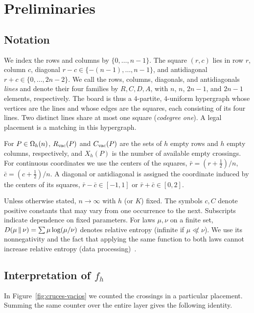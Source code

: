 \section{Preliminaries}\label{sec:preliminares}

\subsection{Notation}

We index the rows and columns by $\{0,\dots,n-1\}$. The square $(r,c)$ lies in row $r$, column $c$, diagonal
$r-c\in\{-(n-1),\dots,n-1\}$, and antidiagonal $r+c\in\{0,\dots,2n-2\}$. We call the rows, columns,
diagonals, and antidiagonals
\emph{lines} and denote their four families by $R,C,D,A$, with $n$, $n$, $2n-1$, and $2n-1$ elements,
respectively. The board is thus
a $4$-partite, $4$-uniform hypergraph whose vertices are the lines and whose edges are the squares, each
consisting of its four lines.
Two distinct lines share at most one square (\emph{codegree one}). A legal placement is a matching in this
hypergraph.

For $P\in\Omega_h(n)$, $R_{\mathrm{vac}}(P)$ and $C_{\mathrm{vac}}(P)$ are the sets of $h$ empty rows and $h$ empty columns,
respectively, and $X_h(P)$ is the
number of available empty crossings. For continuous coordinates we use the centers of the squares,
$\bar r=(r+\frac12)/n$, $\bar c=(c+\frac12)/n$.
A diagonal or antidiagonal is assigned the coordinate induced by the centers of its squares,
$\bar r-\bar c\in[-1,1]$ or $\bar r+\bar
c\in[0,2]$.

Unless otherwise stated, $n\to\infty$ with $h$ (or $K$) fixed. The symbols $c,C$ denote positive constants
that may vary from one
occurrence to the next. Subscripts indicate dependence on fixed parameters. For laws $\mu,\nu$ on a finite
set,
$D(\mu\,\Vert\,\nu)=\sum\mu\log(\mu/\nu)$ denotes relative entropy (infinite if $\mu\not\ll\nu$). We use its
nonnegativity and the fact that
applying the same function to both laws cannot increase relative entropy (data
processing)~\cite{CoverThomas}.

\subsection{Interpretation of \texorpdfstring{$f_h$}{fh}}

In Figure~\ref{fig:cruces-vacios} we counted the crossings in a particular placement. Summing the same
counter over the entire layer
gives the following identity.

